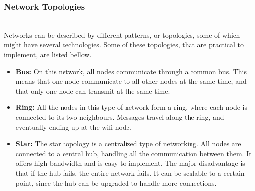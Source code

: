 \subsubsection{Network Topologies}~\\
Networks can be described by different patterns, or topologies, some of which might have several technologies.
Some of these topologies, that are practical to implement, are listed bellow.
\begin{itemize}
\item \textbf{Bus:}
On this network, all nodes communicate through a common bus. 
This means that one node communicate to all other nodes at the same time, and that only one node can transmit at the same time.
\item \textbf{Ring:} All the nodes in this type of network form a ring, where each node is connected to its two neighbours.
Messages travel along the ring, and eventually ending up at the wifi node.
\item \textbf{Star:} The star topology is a centralized type of networking.
All nodes are connected to a central hub, handling all the communication between them.
It offers high bandwidth and is easy to implement.
The major disadvantage is that if the hub fails, the entire network fails.
It can be scalable to a certain point, since the hub can be upgraded to handle more connections.
\end{itemize}

